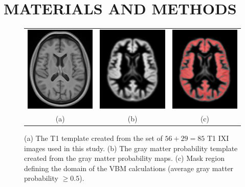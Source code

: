 \documentclass[]{spie}  %
\begin{document}
\section{MATERIALS AND METHODS} 

\begin{figure}
\begin{center}
\begin{tabular}{ccc}
  \includegraphics[width=50mm]{atlas.png}&
  \includegraphics[width=50mm]{atlas_gm.png}&
  \includegraphics[width=50mm]{atlas_mask.png} \\
  (a) & (b) & (c)
\end{tabular}
\end{center}
\caption{(a) The T1 template created from the set of $56+29=85$ T1 IXI images used in this study.
(b) The gray matter probability template created from the gray matter probability maps.
(c) Mask region defining the domain of the VBM calculations (average gray matter probability $\geq 0.5$).
 }
\label{fig:template}
\end{figure}
\end{document}
